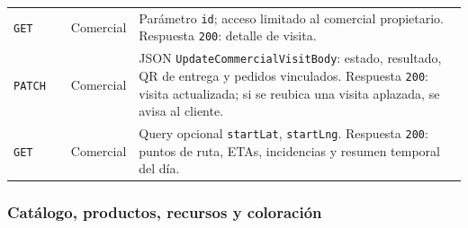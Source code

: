{\begin{longtable}{A{0.10\textwidth}A{0.27\textwidth}A{0.15\textwidth}A{0.38\textwidth}}
\texttt{GET} &  & Comercial & Parámetro \texttt{id}; acceso limitado al comercial propietario. Respuesta \texttt{200}: detalle de visita.\\
\texttt{PATCH} &  & Comercial & JSON \texttt{UpdateCommercialVisitBody}: estado, resultado, QR de entrega y pedidos vinculados. Respuesta \texttt{200}: visita actualizada; si se reubica una visita aplazada, se avisa al cliente.\\
\texttt{GET} &  & Comercial & Query opcional \texttt{startLat}, \texttt{startLng}. Respuesta \texttt{200}: puntos de ruta, ETAs, incidencias y resumen temporal del día.\\
\end{longtable}
}

\subsubsection{Catálogo, productos, recursos y coloración}

